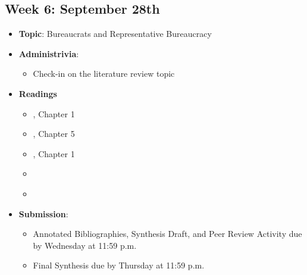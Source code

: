 \documentclass[12pt, letterpaper]{article}
\begin{document}
\subsection*{Week 6: September 28th}
    \begin{itemize}
        \item \textbf{Topic}: Bureaucrats and Representative Bureaucracy
        \item \textbf{Administrivia}:
            \begin{itemize}
                \item Check-in on the literature review topic
            \end{itemize}
        \item \textbf{Readings}
            \begin{itemize}
                \item \cite{Behn2001}, Chapter 1
                \item \cite{Denhardt2015}, Chapter 5   
                \item \cite{Krislov1974}, Chapter 1
                \item \cite{MaynardMoody2012}
                \item \cite{Headly2021}
            \end{itemize}
        \item \textbf{Submission}: 
            \begin{itemize}
                \item Annotated Bibliographies, Synthesis Draft, and Peer Review Activity due by Wednesday at 11:59 p.m. 
                \item Final Synthesis due by Thursday at 11:59 p.m.
            \end{itemize} 
    \end{itemize}
\end{document}
